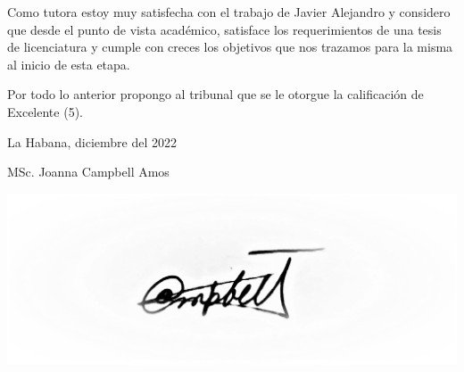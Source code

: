 Como tutora estoy muy satisfecha con el trabajo de Javier Alejandro y considero que desde el punto de vista acad\'emico, satisface los requerimientos de una tesis de licenciatura y cumple con creces los objetivos que nos trazamos para la misma al inicio de esta etapa.

Por todo lo anterior propongo al tribunal que se le otorgue la calificaci\'on de Excelente (5).

{\setlength{\parindent}{9.5cm} La Habana, diciembre del 2022}

MSc. Joanna Campbell Amos 

\includegraphics[scale=0.2]{images/firma.jpg}
